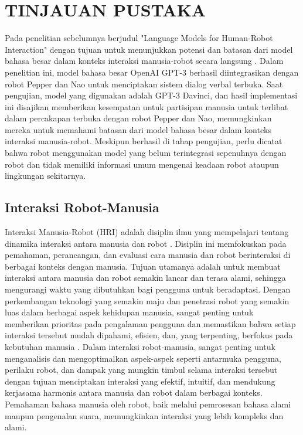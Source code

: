 
\chapter{TINJAUAN PUSTAKA}
\label{chap:tinjauanpustaka}


Pada penelitian sebelumnya berjudul "Language Models for Human-Robot Interaction" dengan tujuan untuk menunjukkan potensi dan batasan dari model bahasa besar dalam konteks interaksi manusia-robot secara langsung \parencite{inproceedings}. Dalam penelitian ini, model bahasa besar OpenAI GPT-3 berhasil diintegrasikan dengan robot Pepper dan Nao untuk menciptakan sistem dialog verbal terbuka. Saat pengujian, model yang digunakan adalah GPT-3 Davinci, dan hasil implementasi ini disajikan memberikan kesempatan untuk partisipan manusia untuk terlibat dalam percakapan terbuka dengan robot Pepper dan Nao, memungkinkan mereka untuk memahami batasan dari model bahasa besar dalam konteks interaksi manusia-robot. Meskipun berhasil di tahap pengujian, perlu dicatat bahwa robot menggunakan model yang belum terintegrasi sepenuhnya dengan robot dan tidak memiliki informasi umum mengenai keadaan robot ataupun lingkungan sekitarnya.

\section{Interaksi Robot-Manusia}
Interaksi Manusia-Robot (HRI) adalah disiplin ilmu yang mempelajari tentang dinamika interaksi antara manusia dan robot \parencite{VASCONEZ201935}. Disiplin ini memfokuskan pada pemahaman, perancangan, dan evaluasi cara manusia dan robot berinteraksi di berbagai konteks dengan manusia. Tujuan utamanya adalah untuk membuat interaksi antara manusia dan robot semakin lancar dan terasa alami, sehingga mengurangi waktu yang dibutuhkan bagi pengguna untuk beradaptasi. Dengan perkembangan teknologi yang semakin maju dan penetrasi robot yang semakin luas dalam berbagai aspek kehidupan manusia, sangat penting untuk memberikan prioritas pada pengalaman pengguna dan memastikan bahwa setiap interaksi tersebut mudah dipahami, efisien, dan, yang terpenting, berfokus pada kebutuhan manusia \parencite{chikwendu2023human}. Dalam interaksi robot-manusia, sangat penting untuk menganalisis dan mengoptimalkan aspek-aspek seperti antarmuka pengguna, perilaku robot, dan dampak yang mungkin timbul selama interaksi tersebut dengan tujuan menciptakan interaksi yang efektif, intuitif, dan mendukung kerjasama harmonis antara manusia dan robot dalam berbagai konteks. Pemahaman bahasa manusia oleh robot, baik melalui pemrosesan bahasa alami maupun pengenalan suara, memungkinkan interaksi yang lebih kompleks dan alami. 


